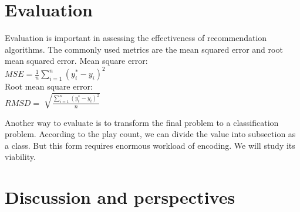 \documentclass{article}
\begin{document}
\section{Evaluation}
Evaluation is important in assessing the effectiveness of recommendation algorithms. The commonly used metrics are the mean squared error and root mean squared error.
Mean square error: \\
$MSE = \frac{1}{n}\sum_{i=1}^{n}(y_{i}^{*}-y_{i})^{2}$
\\
Root mean square error:\\
$RMSD = \sqrt[]{\frac{\sum_{i=1}^{n}(y_{i}^{*}-y_{i})^{2}}{n}}$

Another way to evaluate is to transform the final problem to a classification problem. According to the play count, we can divide the value into subsection as a class. But this form requires enormous workload of encoding. We will study its viability.

\section{Discussion and perspectives}
\end{document}

